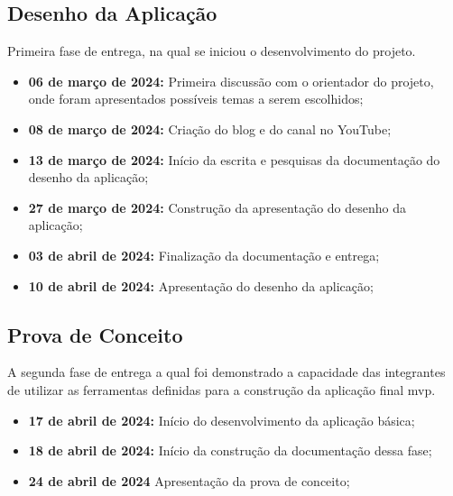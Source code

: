 \begin{apendicesenv}
\subsection*{Desenho da Aplicação}
Primeira fase de entrega, na qual se iniciou o desenvolvimento do projeto.
\begin{itemize}
        \item \textbf{06 de março de 2024:}
        Primeira discussão com o orientador do projeto, onde foram apresentados possíveis temas a serem escolhidos;
        \item \textbf{08 de março de 2024:}
        Criação do blog e do canal no YouTube;
        \item \textbf{13 de março de 2024:}
         Início da escrita e pesquisas da documentação do desenho da aplicação;
        \item \textbf{27 de março de 2024:}
         Construção da apresentação do desenho da aplicação;
        \item \textbf{03 de abril de 2024:}
         Finalização da documentação e entrega;
        \item \textbf{10 de abril de 2024:}
         Apresentação do desenho da aplicação;
     \end{itemize}
\subsection*{Prova de Conceito}
A segunda fase de entrega a qual foi demonstrado a capacidade das integrantes de utilizar as ferramentas definidas para a construção da aplicação final \ac{mvp}.
\begin{itemize}
        \item \textbf{17 de abril de 2024:}
         Início do desenvolvimento da aplicação básica;
        \item \textbf{18 de abril de 2024:}
         Início da construção da documentação dessa fase;
        \item \textbf{24 de abril de 2024}
         Apresentação da prova de conceito;
     \end{itemize}

\end{apendicesenv}
